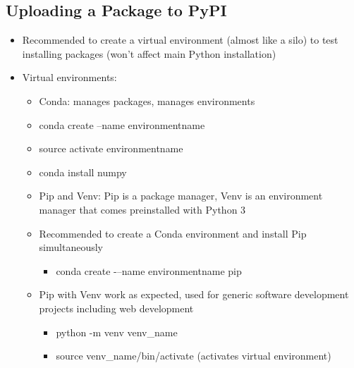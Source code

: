 \subsection{Uploading a Package to PyPI}
\begin{itemize}
	\item Recommended to create a virtual environment (almost like a silo) to test installing packages (won't affect main Python installation)
	\item Virtual environments:
	\begin{itemize}
		\item Conda: manages packages, manages environments
		\item conda create --name environmentname
		\item source activate environmentname
		\item conda install numpy
		\item Pip and Venv: Pip is a package manager, Venv is an environment manager that comes preinstalled with Python 3
		\item Recommended to create a Conda environment and install Pip simultaneously
		\begin{itemize}
			\item conda create -–name environmentname pip
		\end{itemize}
		\item Pip with Venv work as expected, used for generic software development projects including web development
		\begin{itemize}
			\item python -m venv venv\_name
			\item source venv\_name/bin/activate (activates virtual environment)
		\end{itemize}
	\end{itemize}
\end{itemize}











